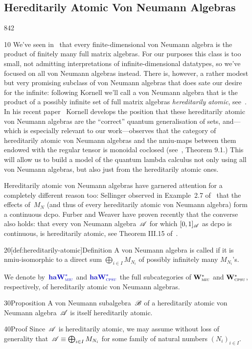 \subsection{Hereditarily Atomic Von Neumann Algebras}
\begin{parsec}{842}
\begin{point}{10}%
We've seen in~
that every finite-dimensional von Neumann algebra
is the product of finitely many full matrix algebras.
For our purposes this class is too small,
not admitting interpretations of infinite-dimensional
datatypes,
so we've focused on all von Neumann algebras instead.
There is,
however, a rather modest but very promising subclass
of von Neumann algebras
that does sate our desire for the infinite:
following Kornell
we'll call a von Neumann algebra that is the 
    product of a possibly infinite set
of full matrix algebras
\emph{hereditarily atomic}, see~.
In his recent paper~\cite{kornell2018quantum}
Kornell develops the position
that these hereditarily atomic von Neumann 
algebras are the ``correct'' quantum generalisation
of sets, and---which is especially relevant to our work---observes
that the category of hereditarily atomic von Neumann 
algebras and the nmiu-maps between
them endowed with the regular 
tensor is monoidal coclosed (see~\cite{kornell2018quantum}, Theorem 9.1.)
This will allow us to build a model of the quantum lambda calculus
not only using all von Neumann algebras,
but also just from the hereditarily atomic ones.

Hereditarily atomic von Neumann algebras
have garnered attention for a completely different reason too:
Sellinger observed in Example~2.7 of~\cite{selinger2004towards} 
that the effects of~$M_N$
(and thus of every hereditarily atomic von Neumann algebra)
form a continuous dcpo.
Furber and Weaver have proven recently that the converse also holds:
that every von Neumann algebra~$\mathscr{A}$
for which $[0,1]_{\mathscr{A}}$ as dcpo is continuous,
is hereditarily atomic,
see Theorem III.15 of~\cite{furbercontinuous}.
\end{point}
    \begin{point}{20}[def:hereditarily-atomic]{Definition}%
A von Neumann algebra is called %
%
if it is nmiu-isomorphic
to a direct sum
$\bigoplus_{i\in I} M_{N_i}$
of possibly infinitely many $M_{N_i}$'s.

We denote by~$\Define{\haW{miu}}$ and  $\Define{\haW{cpsu}}$%
the full subcategories of $\mathbf{W}^*_{\text{\textsc{miu}}}$ and $\mathbf{W}^*_{\text{\textsc{cpsu}}}$, respectively,
of hereditarily atomic von Neumann algebras.
\end{point}
\begin{point}{30}{Proposition}%
A von Neumann subalgebra~$\mathscr{B}$ of a hereditarily atomic
von Neumann algebra~$\mathscr{A}$ is itself hereditarily atomic.
\begin{point}{40}{Proof}%
Since~$\mathscr{A}$ is hereditarily atomic, 
we may assume without loss of generality
that~$\mathscr{A} \equiv \bigoplus_{i \in I} M_{N_i}$
for some family of natural numbers $(N_i)_{i\in I}$.


\end{point}
\end{point}
\end{parsec}
